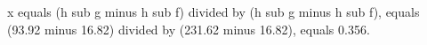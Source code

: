 x equals (h sub g minus h sub f) divided by (h sub g minus h sub f), equals (93.92 minus 16.82) divided by (231.62 minus 16.82), equals 0.356.
